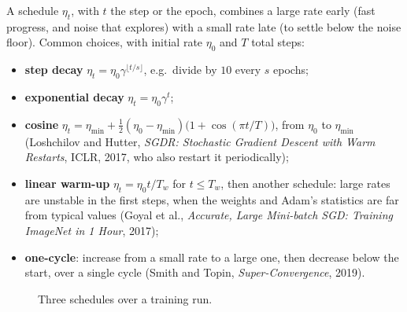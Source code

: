 \begin{notechapter}
A schedule $\eta_t$, with $t$ the step or the epoch, combines a large rate early (fast progress,
and noise that explores) with a small rate late (to settle below the noise floor). Common
choices, with initial rate $\eta_0$ and $T$ total steps:
\begin{itemize}[nosep]
  \item \textbf{step decay} $\eta_t = \eta_0\gamma^{\lfloor t/s\rfloor}$, e.g.\ divide by $10$ every $s$ epochs;
  \item \textbf{exponential decay} $\eta_t = \eta_0\gamma^t$;
  \item \textbf{cosine} $\eta_t = \eta_{\min} + \frac12(\eta_0 - \eta_{\min})\bigl(1 + \cos(\pi t/T)\bigr)$, from $\eta_0$ to $\eta_{\min}$ (Loshchilov and Hutter,
        \emph{SGDR: Stochastic Gradient Descent with Warm Restarts}, ICLR, 2017, who also restart
        it periodically);
  \item \textbf{linear warm-up} $\eta_t = \eta_0t/T_w$ for $t\leq T_w$, then another schedule: large rates are unstable in the
        first steps, when the weights and Adam's statistics are far from typical values (Goyal
        et al., \emph{Accurate, Large Mini-batch SGD: Training ImageNet in 1 Hour}, 2017);
  \item \textbf{one-cycle}: increase from a small rate to a large one, then decrease below the
        start, over a single cycle (Smith and Topin, \emph{Super-Convergence}, 2019).
\end{itemize}

\begin{figure}[ht]
\centering
{}
\caption{Three schedules over a training run.}
\label{optimizers:fig:schedules}
\end{figure}


\end{notechapter}
